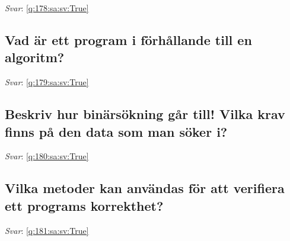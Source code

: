 \documentclass[a4paper,11pt,oneside]{article}
\begin{document}
\begin{sloppypar}
\label{q:178:sa:sv:False}

\vspace{2cm}

\noindent\makebox[\textwidth]{\hrulefill}

\vspace{1cm}

\textit{Svar}: \autoref{q:178:sa:sv:True}



\subsection{Vad \"ar ett program i f\"orh\r{a}llande till en algoritm?}

\label{q:179:sa:sv:False}

\vspace{2cm}

\noindent\makebox[\textwidth]{\hrulefill}

\vspace{1cm}

\textit{Svar}: \autoref{q:179:sa:sv:True}



\subsection{Beskriv hur bin\"ars\"okning g\r{a}r till! Vilka krav finns p\r{a} den data som man s\"oker i?}

\label{q:180:sa:sv:False}

\vspace{2cm}

\noindent\makebox[\textwidth]{\hrulefill}

\vspace{1cm}

\textit{Svar}: \autoref{q:180:sa:sv:True}



\subsection{Vilka metoder kan anv\"andas f\"or att verifiera ett programs korrekthet?}

\label{q:181:sa:sv:False}

\vspace{2cm}

\noindent\makebox[\textwidth]{\hrulefill}

\vspace{1cm}

\textit{Svar}: \autoref{q:181:sa:sv:True}




\end{sloppypar}
\end{document}
